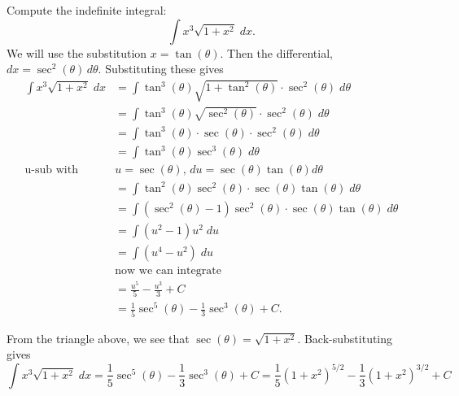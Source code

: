 \documentclass{ximera}
\begin{document}
\begin{example}[example 9]
Compute the indefinite integral:
\[
\int x^3\sqrt{1+x^2} \; dx.
\]
We will use the substitution $x = \tan(\theta)$.  Then the differential, 
$dx = \sec^2(\theta) \, d\theta$.  Substituting these gives
\begin{align*}
\int x^3\sqrt{1+x^2} \; dx &= \int \tan^3(\theta) \sqrt{1+\tan^2(\theta)} \cdot \sec^2(\theta) \; d\theta\\[6pt]
                           &= \int \tan^3(\theta) \sqrt{\sec^2(\theta)} \cdot \sec^2(\theta) \; d\theta\\[6pt]
                           &= \int \tan^3(\theta) \cdot \sec(\theta) \cdot \sec^2(\theta) \; d\theta\\[6pt]
                           &= \int \tan^3(\theta) \sec^3(\theta) \; d\theta\\[6pt]
                           \text{u-sub with } \; & u=\sec(\theta), \, du = \sec(\theta) \tan(\theta) d\theta\\[6pt]
                           &= \int \tan^2(\theta) \sec^2(\theta) \cdot \sec(\theta) \tan(\theta)\; d\theta\\[6pt]
                           &= \int \left(\sec^2(\theta)-1 \right) \sec^2(\theta) \cdot \sec(\theta) \tan(\theta)\; d\theta\\[6pt] 
                           &= \int (u^2 -1)u^2 \; du\\[6pt] 
                           &= \int (u^4 -u^2) \; du\\[6pt]
                           &\text{now we can integrate}\\[6pt]
                           &= \frac{u^5}{5} - \frac{u^3}{3} + C\\[6pt]
                           &= \frac15 \sec^5(\theta)  - \frac13 \sec^3(\theta) + C.
\end{align*}




\begin{image}
\end{image}




From the triangle above, we see that $\sec(\theta)= \sqrt{1+x^2}$.  Back-substituting gives
\[
\int x^3\sqrt{1+x^2} \; dx = \frac15 \sec^5(\theta)  - \frac13 \sec^3(\theta) + C = \frac15 (1+x^2)^{5/2}  - \frac13 (1+x^2)^{3/2} + C
\]

\end{example}
\end{document}
